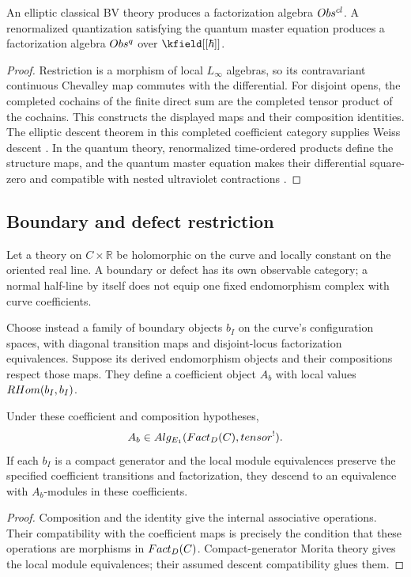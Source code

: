 \begin{theorem}
An elliptic classical BV theory produces a factorization algebra $Obs^{cl}$. A renormalized quantization satisfying the quantum master equation produces a factorization algebra $Obs^{q}$ over $\kfield[[\hbar]]$.
\end{theorem}
\begin{proof}
Restriction is a morphism of local $L_\infty$ algebras, so its
contravariant continuous Chevalley map commutes with the differential.
For disjoint opens, the completed cochains of the finite direct sum
are the completed tensor product of the cochains. This constructs
the displayed maps and their composition identities.
The elliptic descent theorem in this completed coefficient category
supplies Weiss descent \cite{CG1,CG2}. In the quantum theory, renormalized time-ordered products define the structure maps, and the quantum master equation makes their differential square-zero and compatible with nested ultraviolet contractions \cite{CG1,CG2}.
\end{proof}

\subsection{Boundary and defect restriction}
Let a theory on $C\times\mathbb R$ be holomorphic on the curve and
locally constant on the oriented real line. A boundary or defect has its
own observable category; a normal half-line by itself does not equip
one fixed endomorphism complex with curve coefficients.

Choose instead a family of boundary objects $b_I$ on the curve's
configuration spaces, with diagonal transition maps and disjoint-locus
factorization equivalences. Suppose its derived endomorphism objects
and their compositions respect those maps. They define a coefficient
object $A_b$ with local values $RHom(b_I,b_I)$.

\begin{theorem}
Under these coefficient and composition hypotheses,
\[
 A_b\in Alg_{E_1}(Fact_D(C),tensor^!).
\]
If each $b_I$ is a compact generator and the local module equivalences
preserve the specified coefficient transitions and factorization, they
descend to an equivalence with $A_b$-modules in these coefficients.
\end{theorem}
\begin{proof}
Composition and the identity give the internal associative operations.
Their compatibility with the coefficient maps is precisely the
condition that these operations are morphisms in $Fact_D(C)$.
Compact-generator Morita theory gives the local module equivalences;
their assumed descent compatibility glues them.
\end{proof}


